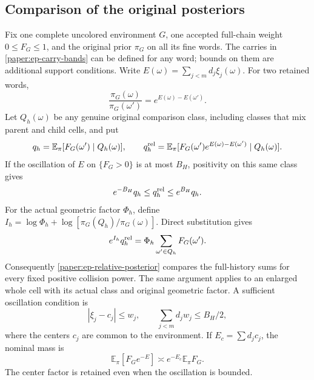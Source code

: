 \subsection{Comparison of the original posteriors}
\label{paper:ep-posteriors}

Fix one complete uncolored environment $G$, one accepted full-chain
weight $0\le F_G\le1$, and the original prior $\pi_G$ on all its fine
words. The carries in \eqref{paper:ep-carry-bands} can be defined for
any word; bounds on them are additional support conditions. Write
$E(\omega)=\sum_{j<m}d_j\xi_j(\omega)$. For two retained words,
\[
 \frac{\pi_G(\omega)}{\pi_G(\omega')}
   =e^{E(\omega)-E(\omega')}.
\]
Let $Q_h(\omega)$ be any genuine original comparison class, including
classes that mix parent and child cells, and put
\[
 q_h=\mathbb E_\pi[F_G(\omega')\mid Q_h(\omega)],\qquad
 q_h^{\rm rel}=\mathbb E_\pi[
 F_G(\omega')e^{E(\omega)-E(\omega')}\mid Q_h(\omega)].
\]
If the oscillation of $E$ on $\{F_G>0\}$ is at most $B_H$, positivity
on this same class gives
\begin{equation}
 e^{-B_H}q_h\le q_h^{\rm rel}\le e^{B_H}q_h.
 \label{paper:ep-relative-posterior}
\end{equation}
For the actual geometric factor $\Phi_h$, define
$I_h=\log\Phi_h+\log[\pi_G(Q_h)/\pi_G(\omega)]$. Direct substitution gives
\[
 e^{I_h}q_h^{\rm rel}=\Phi_h\sum_{\omega'\in Q_h}F_G(\omega').
\]
Consequently \eqref{paper:ep-relative-posterior} compares the full-history
sums for every fixed positive collision power. The same argument applies
to an enlarged whole cell with its actual class and original geometric factor.
A sufficient oscillation condition is
\[
 |\xi_j-c_j|\le w_j,\qquad
 \sum_{j<m}d_jw_j\le B_H/2,
\]
where the centers $c_j$ are common to the environment. If
$E_c=\sum d_jc_j$, the nominal mass is
\[
 \mathbb E_\pi[F_Ge^{-E}]\asymp e^{-E_c}\mathbb E_\pi F_G.
\]
The center factor is retained even when the oscillation is bounded.

